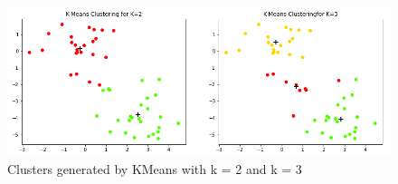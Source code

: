 \begin{figure}[H]
	\centering
	\includegraphics[width=14cm]{Img/KMeans.PNG}
	\caption{Clusters generated by KMeans with k = 2 and k = 3}
	\label{fig:KMeans}
\end{figure} 